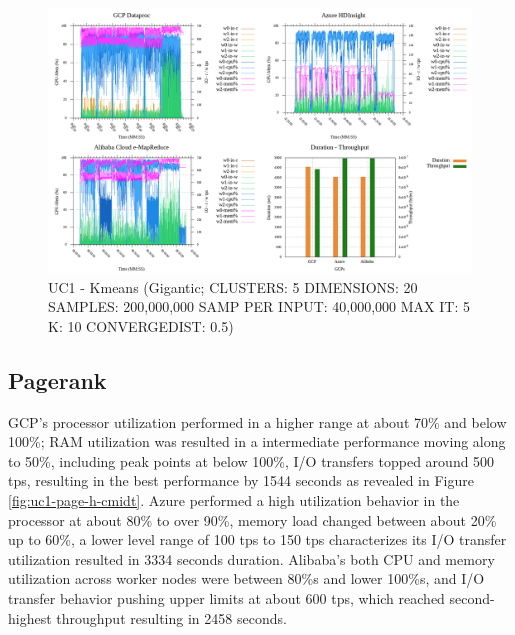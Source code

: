 \documentclass[review]{elsarticle}
\begin{document}
\begin{figure}[p]
	\caption{UC1 - Kmeans (Gigantic; CLUSTERS: 5 DIMENSIONS: 20 SAMPLES: 200,000,000 SAMP PER INPUT: 40,000,000 MAX IT: 5 K: 10 CONVERGEDIST: 0.5)}
	\label{fig:uc1-kmeans-g-cmidt}
	\includegraphics[width=\textwidth]{uc1-kmeans-g-cmidt}
	\centering
\end{figure}


\subsection{Pagerank}
GCP's processor utilization performed in a higher range at about 70\% and below 100\%; RAM utilization was resulted in a intermediate performance moving along to 50\%, including peak points at below 100\%, I/O transfers topped around 500 tps, resulting in the best performance by 1544 seconds as revealed in Figure \ref{fig:uc1-page-h-cmidt}. Azure performed a high utilization behavior in the processor at about 80\% to over 90\%, memory load changed between about 20\% up to 60\%, a lower level range of 100 tps to 150 tps characterizes its I/O transfer utilization resulted in 3334 seconds duration. Alibaba's both CPU and memory utilization across worker nodes were between 80\%s and lower 100\%s, and I/O transfer behavior pushing upper limits at about 600 tps, which reached second-highest throughput resulting in 2458 seconds.
\end{document}
